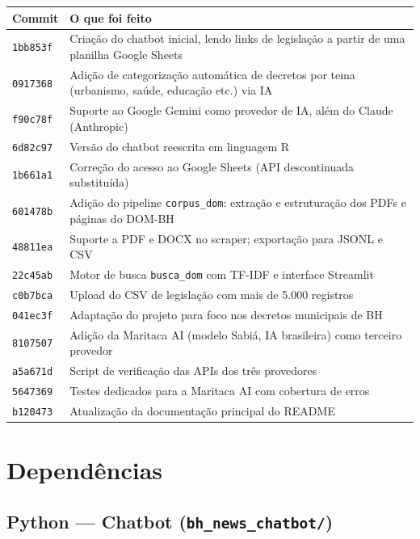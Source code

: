 \documentclass[12pt,a4paper]{article}
\begin{document}
\begin{longtable}{lp{10.5cm}}
  \toprule
  \textbf{Commit} & \textbf{O que foi feito} \\
  \midrule
  \endhead
  \texttt{1bb853f} & Criação do chatbot inicial, lendo links de legislação a partir de uma planilha Google Sheets \\[4pt]
  \texttt{0917368} & Adição de categorização automática de decretos por tema (urbanismo, saúde, educação etc.) via IA \\[4pt]
  \texttt{f90c78f} & Suporte ao Google Gemini como provedor de IA, além do Claude (Anthropic) \\[4pt]
  \texttt{6d82c97} & Versão do chatbot reescrita em linguagem R \\[4pt]
  \texttt{1b661a1} & Correção do acesso ao Google Sheets (API descontinuada substituída) \\[4pt]
  \texttt{601478b} & Adição do pipeline \texttt{corpus\_dom}: extração e estruturação dos PDFs e páginas do DOM-BH \\[4pt]
  \texttt{48811ea} & Suporte a PDF e DOCX no scraper; exportação para JSONL e CSV \\[4pt]
  \texttt{22c45ab} & Motor de busca \texttt{busca\_dom} com TF-IDF e interface Streamlit \\[4pt]
  \texttt{c0b7bca} & Upload do CSV de legislação com mais de 5.000 registros \\[4pt]
  \texttt{041ec3f} & Adaptação do projeto para foco nos decretos municipais de BH \\[4pt]
  \texttt{8107507} & Adição da Maritaca AI (modelo Sabiá, IA brasileira) como terceiro provedor \\[4pt]
  \texttt{a5a671d} & Script de verificação das APIs dos três provedores \\[4pt]
  \texttt{5647369} & Testes dedicados para a Maritaca AI com cobertura de erros \\[4pt]
  \texttt{b120473} & Atualização da documentação principal do README \\
  \bottomrule
\end{longtable}

\section{Dependências}

\subsection{Python --- Chatbot (\texttt{bh\_news\_chatbot/})}
\end{document}

